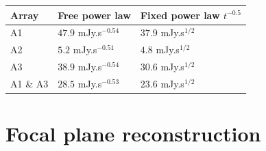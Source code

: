 \documentclass[a4paper, 11pt]{article} %
\begin{document}
\begin{table}
\begin{tabular}{|l|l|l|}
\hline
Array & Free power law & Fixed power law $t^{-0.5}$\\
\hline
A1 & $47.9$ mJy.s$^{-0.54}$ & $37.9$ mJy.s$^{1/2}$\\
A2 & $5.2$ mJy.s$^{-0.51}$  & $4.8$ mJy.s$^{1/2}$\\
A3 & $38.9$ mJy.s$^{-0.54}$ & $30.6$ mJy.s$^{1/2}$\\
A1 \& A3 & $28.5$ mJy.s$^{-0.53}$ & $23.6$ mJy.s$^{1/2}$\\
\hline
\end{tabular}
\end{table}


\section{Focal plane reconstruction}
\label{se:fov}
\end{document}
